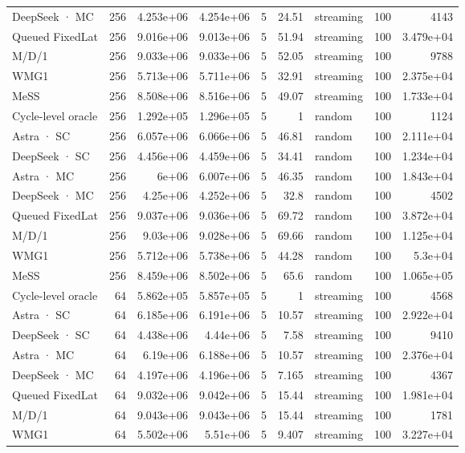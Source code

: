 \begin{tabular}{lrrrrrlrr}
DeepSeek · MC & 256 & 4.253e+06 & 4.254e+06 & 5 & 24.51 & streaming & 100 & 4143 \\
Queued FixedLat & 256 & 9.016e+06 & 9.013e+06 & 5 & 51.94 & streaming & 100 & 3.479e+04 \\
M/D/1 & 256 & 9.033e+06 & 9.033e+06 & 5 & 52.05 & streaming & 100 & 9788 \\
WMG1 & 256 & 5.713e+06 & 5.711e+06 & 5 & 32.91 & streaming & 100 & 2.375e+04 \\
MeSS & 256 & 8.508e+06 & 8.516e+06 & 5 & 49.07 & streaming & 100 & 1.733e+04 \\
Cycle-level oracle & 256 & 1.292e+05 & 1.296e+05 & 5 & 1 & random & 100 & 1124 \\
Astra · SC & 256 & 6.057e+06 & 6.066e+06 & 5 & 46.81 & random & 100 & 2.111e+04 \\
DeepSeek · SC & 256 & 4.456e+06 & 4.459e+06 & 5 & 34.41 & random & 100 & 1.234e+04 \\
Astra · MC & 256 & 6e+06 & 6.007e+06 & 5 & 46.35 & random & 100 & 1.843e+04 \\
DeepSeek · MC & 256 & 4.25e+06 & 4.252e+06 & 5 & 32.8 & random & 100 & 4502 \\
Queued FixedLat & 256 & 9.037e+06 & 9.036e+06 & 5 & 69.72 & random & 100 & 3.872e+04 \\
M/D/1 & 256 & 9.03e+06 & 9.028e+06 & 5 & 69.66 & random & 100 & 1.125e+04 \\
WMG1 & 256 & 5.712e+06 & 5.738e+06 & 5 & 44.28 & random & 100 & 5.3e+04 \\
MeSS & 256 & 8.459e+06 & 8.502e+06 & 5 & 65.6 & random & 100 & 1.065e+05 \\
Cycle-level oracle & 64 & 5.862e+05 & 5.857e+05 & 5 & 1 & streaming & 100 & 4568 \\
Astra · SC & 64 & 6.185e+06 & 6.191e+06 & 5 & 10.57 & streaming & 100 & 2.922e+04 \\
DeepSeek · SC & 64 & 4.438e+06 & 4.44e+06 & 5 & 7.58 & streaming & 100 & 9410 \\
Astra · MC & 64 & 6.19e+06 & 6.188e+06 & 5 & 10.57 & streaming & 100 & 2.376e+04 \\
DeepSeek · MC & 64 & 4.197e+06 & 4.196e+06 & 5 & 7.165 & streaming & 100 & 4367 \\
Queued FixedLat & 64 & 9.032e+06 & 9.042e+06 & 5 & 15.44 & streaming & 100 & 1.981e+04 \\
M/D/1 & 64 & 9.043e+06 & 9.043e+06 & 5 & 15.44 & streaming & 100 & 1781 \\
WMG1 & 64 & 5.502e+06 & 5.51e+06 & 5 & 9.407 & streaming & 100 & 3.227e+04 \\

\end{tabular}
